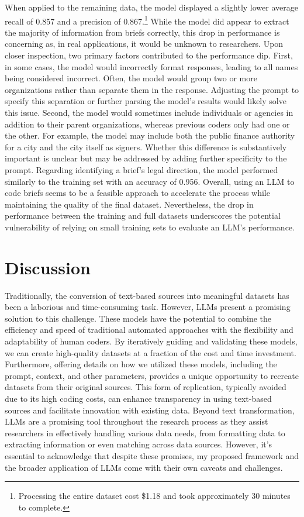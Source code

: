     When applied to the remaining data, the model displayed a slightly lower average recall of 0.857 and a precision of 0.867.\footnote{Processing the entire dataset cost \$1.18 and took approximately 30 minutes to complete.} While the model did appear to extract the majority of information from briefs correctly, this drop in performance is concerning as, in real applications, it would be unknown to researchers. Upon closer inspection, two primary factors contributed to the performance dip. First, in some cases, the model would incorrectly format responses, leading to all names being considered incorrect. Often, the model would group two or more organizations rather than separate them in the response. Adjusting the prompt to specify this separation or further parsing the model's results would likely solve this issue. Second, the model would sometimes include individuals or agencies in addition to their parent organizations, whereas previous coders only had one or the other. For example, the model may include both the public finance authority for a city and the city itself as signers. Whether this difference is substantively important is unclear but may be addressed by adding further specificity to the prompt. Regarding identifying a brief's legal direction, the model performed similarly to the training set with an accuracy of 0.956. Overall, using an LLM to code briefs seems to be a feasible approach to accelerate the process while maintaining the quality of the final dataset. Nevertheless, the drop in performance between the training and full datasets underscores the potential vulnerability of relying on small training sets to evaluate an LLM's performance.

    
    \section{Discussion}
    Traditionally, the conversion of text-based sources into meaningful datasets has been a laborious and time-consuming task. However, LLMs present a promising solution to this challenge. These models have the potential to combine the efficiency and speed of traditional automated approaches with the flexibility and adaptability of human coders. By iteratively guiding and validating these models, we can create high-quality datasets at a fraction of the cost and time investment. Furthermore, offering details on how we utilized these models, including the prompt, context, and other parameters, provides a unique opportunity to recreate datasets from their original sources. This form of replication, typically avoided due to its high coding costs, can enhance transparency in using text-based sources and facilitate innovation with existing data. Beyond text transformation, LLMs are a promising tool throughout the research process as they assist researchers in effectively handling various data needs, from formatting data to extracting information or even matching across data sources. However, it's essential to acknowledge that despite these promises, my proposed framework and the broader application of LLMs come with their own caveats and challenges.

